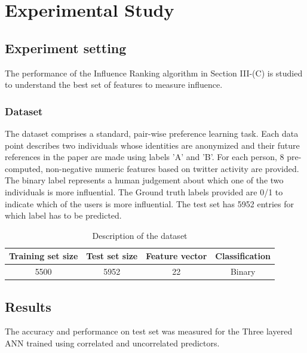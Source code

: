 \section{Experimental Study}

\subsection{Experiment setting}

The performance of the Influence Ranking algorithm in Section III-(C) is studied to understand the best set of features to measure influence.\\

\subsubsection{Dataset}  
The dataset comprises a standard, pair-wise preference learning task. Each data point describes two individuals whose identities are anonymized and their future references in the paper are made using labels 'A' and 'B'. For each person, 8 pre-computed, non-negative numeric features based on twitter activity are provided. The binary label represents a human judgement about which one of the two individuals is more influential. The Ground truth labels provided are 0/1 to indicate which of the users is more influential. The test set has 5952 entries for which label has to be predicted.

\begin{table}[!h]
\renewcommand{\arraystretch}{1.3}
\caption{Description of the dataset}
\label{table}
\centering
\begin{tabular}{|c|c|c|c|}
  \hline
\multicolumn{1}{|c|}{\textbf{Training set size}} & \multicolumn{1}{c|}{\textbf{Test set size}} & \multicolumn{1}{c|}{\textbf{Feature vector}} & \multicolumn{1}{c|}{\textbf{Classification}}\\
  \hline
  5500 & 5952 &  22 & Binary\\
  \hline
\end{tabular}
\end{table}


\subsection{Results}

The accuracy and performance on test set was measured for the Three layered ANN trained using correlated and uncorrelated predictors.

